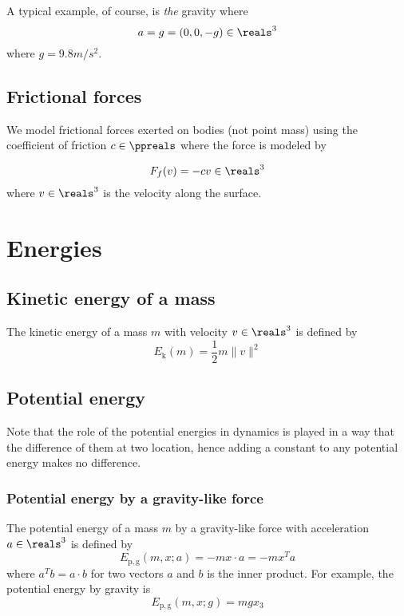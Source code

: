 \documentclass[12pt]{article}
\begin{document}
A typical example, of course, is \emph{the} gravity where
\[
	a = g = (0,0,-g)
	\in\reals^3
\]
where $g = 9.8 m/s^2$.

\subsection{Frictional forces}

We model frictional forces exerted on bodies (not point mass)
using the coefficient of friction $c\in\ppreals$ where the force is modeled by

\begin{equation}
\label{eq:force:frictional}
F_f(v) = -c v
	\in\reals^3
\end{equation}
where $v\in\reals^3$ is the velocity along the surface.

\section{Energies}

\subsection{Kinetic energy of a mass}

The kinetic energy of a mass $m$ with velocity $v\in\reals^3$
is defined by
\begin{equation}
\label{eq:energy:kinetic}
	E_\mathrm{k}(m) = \frac{1}{2} m\|v\|^2
\end{equation}

\subsection{Potential energy}

Note that the role of the potential energies in dynamics
is played in a way that the difference of them at two location,
hence adding a constant to any potential energy
makes no difference.

\subsubsection{Potential energy by a gravity-like force}

The potential energy of a mass $m$ by a gravity-like force with acceleration $a\in\reals^3$
is defined by
\begin{equation}
\label{eq:energy:potential:gravity-like}
E_\mathrm{p,g}(m,x;a)
=  - m x\cdot a
= - m x^Ta
\end{equation}
where $a^Tb = a\cdot b$ for two vectors $a$ and $b$
is the inner product.
For example, the potential energy by gravity is
\[
	E_\mathrm{p,g}(m,x;g)
	=  mgx_3
\]
\end{document}
